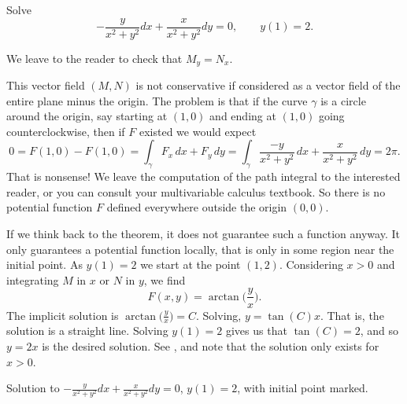 \documentclass{ximera}
\begin{document}
\begin{example}
    Solve
    \begin{equation*}
        -\frac{y}{x^2+y^2} dx + \frac{x}{x^2+y^2} dy = 0 , \qquad y(1) = 2.
    \end{equation*}
\end{example}

\begin{exampleSol}
    We leave to the reader to check that $M_y = N_x$.
    
    This vector field $(M,N)$ is not conservative if considered as a vector field of the entire plane minus the origin.  The problem is that if the curve $\gamma$ is a circle around the origin, say starting at $(1,0)$ and ending at $(1,0)$ going counterclockwise, then if $F$ existed we would expect
    \begin{equation*}
        0 = F(1,0) - F(1,0) = \int_\gamma F_x \, dx + F_y \, dy = \int_\gamma \frac{-y}{x^2+y^2} \, dx + \frac{x}{x^2+y^2} \, dy = 2\pi .
    \end{equation*}
    That is nonsense! We leave the computation of the path integral to the interested reader, or you can consult your multivariable calculus textbook.  So there is no potential function $F$ defined everywhere outside the origin $(0,0)$.
    
    If we think back to the theorem, it does not guarantee such a function anyway.  It only guarantees a potential function locally, that is only in some region near the initial point.  As $y(1) = 2$ we start at the point $(1,2)$.  Considering $x > 0$ and integrating $M$ in $x$ or $N$ in $y$, we find
    \begin{equation*}
        F(x,y) = \operatorname{arctan} \bigl( \frac{y}{x} \bigr) .
    \end{equation*}
    The implicit solution is $\operatorname{arctan} \bigl( \frac{y}{x} \bigr) = C$.  Solving, $y = \tan(C) x$.  That is, the solution is a straight line.  Solving $y(1) = 2$ gives us that $\tan(C) = 2$, and so $y= 2x$ is the desired solution. See , and note that the solution only exists for $x > 0$.
    \begin{myfig}
        \capstart
        \caption{Solution to  $-\frac{y}{x^2+y^2} dx + \frac{x}{x^2+y^2} dy = 0$, $y(1) = 2$, with initial point marked.\label{exact:y2x}}
    \end{myfig}
\end{exampleSol}
\end{document}
